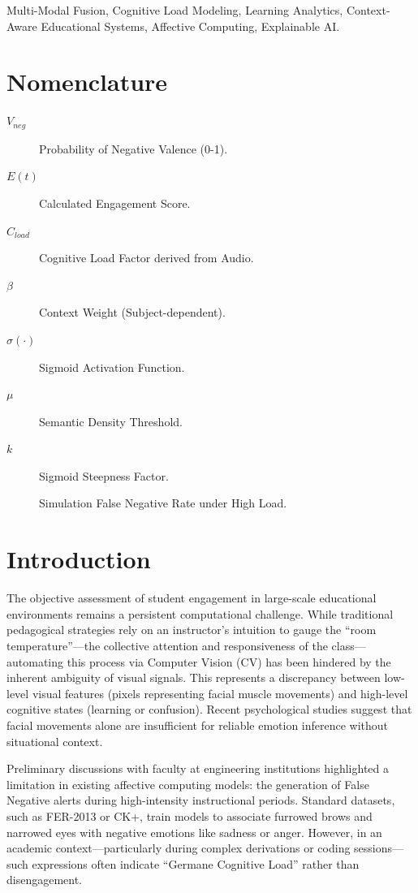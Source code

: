 \documentclass[conference]{IEEEtran}
\begin{document}
\begin{IEEEkeywords}
Multi-Modal Fusion, Cognitive Load Modeling, Learning Analytics, Context-Aware Educational Systems, Affective Computing, Explainable AI.
\end{IEEEkeywords}

\section*{Nomenclature}
\begin{description}
    \item[$V_{neg}$] Probability of Negative Valence (0-1).
    \item[$E(t)$] Calculated Engagement Score.
    \item[$C_{load}$] Cognitive Load Factor derived from Audio.
    \item[$\beta$] Context Weight (Subject-dependent).
    \item[$\sigma(\cdot)$] Sigmoid Activation Function.
    \item[$\mu$] Semantic Density Threshold.
    \item[$k$] Sigmoid Steepness Factor.
    \item[] Simulation False Negative Rate under High Load.
\end{description}

\section{Introduction}
The objective assessment of student engagement in large-scale educational environments remains a persistent computational challenge. While traditional pedagogical strategies rely on an instructor's intuition to gauge the ``room temperature''—the collective attention and responsiveness of the class—automating this process via Computer Vision (CV) has been hindered by the inherent ambiguity of visual signals. This represents a discrepancy between low-level visual features (pixels representing facial muscle movements) and high-level cognitive states (learning or confusion). Recent psychological studies suggest that facial movements alone are insufficient for reliable emotion inference without situational context.

Preliminary discussions with faculty at engineering institutions highlighted a limitation in existing affective computing models: the generation of False Negative alerts during high-intensity instructional periods. Standard datasets, such as FER-2013 or CK+, train models to associate furrowed brows and narrowed eyes with negative emotions like sadness or anger. However, in an academic context—particularly during complex derivations or coding sessions—such expressions often indicate ``Germane Cognitive Load'' rather than disengagement.
\end{document}
